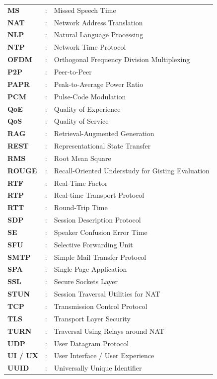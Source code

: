 \documentclass[12pt,oneside,letterpaper]{report}
\numberwithin{equation}{chapter} %
\begin{document}
\begin{longtable}{p{3.0cm}p{0.5cm}p{10.5cm}}
\textbf{MS} & : & Missed Speech Time \\
\textbf{NAT} & : & Network Address Translation \\
\textbf{NLP} & : & Natural Language Processing \\
\textbf{NTP} & : & Network Time Protocol \\
\textbf{OFDM} & : & Orthogonal Frequency Division Multiplexing \\
\textbf{P2P} & : & Peer-to-Peer \\
\textbf{PAPR} & : & Peak-to-Average Power Ratio \\
\textbf{PCM} & : & Pulse-Code Modulation \\
\textbf{QoE} & : & Quality of Experience \\
\textbf{QoS} & : & Quality of Service \\
\textbf{RAG} & : & Retrieval-Augmented Generation \\
\textbf{REST} & : & Representational State Transfer \\
\textbf{RMS} & : & Root Mean Square \\
\textbf{ROUGE} & : & Recall-Oriented Understudy for Gisting Evaluation \\
\textbf{RTF} & : & Real-Time Factor \\
\textbf{RTP} & : & Real-time Transport Protocol \\
\textbf{RTT} & : & Round-Trip Time \\
\textbf{SDP} & : & Session Description Protocol \\
\textbf{SE} & : & Speaker Confusion Error Time \\
\textbf{SFU} & : & Selective Forwarding Unit \\
\textbf{SMTP} & : & Simple Mail Transfer Protocol \\
\textbf{SPA} & : & Single Page Application \\
\textbf{SSL} & : & Secure Sockets Layer \\
\textbf{STUN} & : & Session Traversal Utilities for NAT \\
\textbf{TCP} & : & Transmission Control Protocol \\
\textbf{TLS} & : & Transport Layer Security \\
\textbf{TURN} & : & Traversal Using Relays around NAT \\
\textbf{UDP} & : & User Datagram Protocol \\
\textbf{UI / UX} & : & User Interface / User Experience \\
\textbf{UUID} & : & Universally Unique Identifier \\

\end{longtable}
\end{document}
